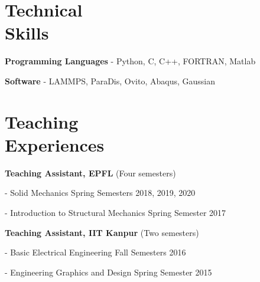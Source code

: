 \documentclass[margin,line]{resume}
\begin{document}
\begin{resume}
    \section{\mysidestyle Technical \\Skills}
    \textbf{\textsf{Programming Languages}} - Python, C, C++,  FORTRAN, Matlab

    \textbf{\textsf{Software}} -  LAMMPS, ParaDis, Ovito, Abaqus, Gaussian

    \clearpage
    \section{\mysidestyle Teaching \\Experiences}

    \textbf{\textsf{Teaching Assistant, EPFL}} \textsf{(Four semesters)}
    \vspace{-0.3cm}\begin{compactitem}
        \item[-] Solid Mechanics \hfill \small{Spring  Semesters 2018, 2019, 2020}
        \item[-] Introduction to Structural Mechanics  \hfill \small{Spring  Semester 2017}
    \end{compactitem}

    \textbf{\textsf{Teaching Assistant, IIT Kanpur}} \textsf{(Two semesters)}
    \vspace{-0.3cm}\begin{compactitem}
        \item[-] Basic Electrical Engineering \hfill \small{Fall  Semesters 2016}
        \item[-] Engineering Graphics and Design  \hfill \small{Spring  Semester 2015}
    \end{compactitem}






\end{resume}
\end{document}
